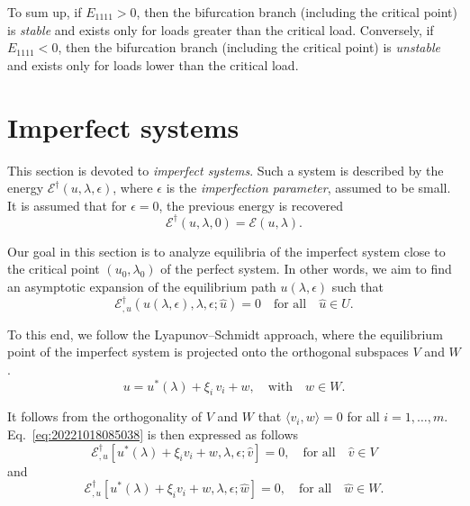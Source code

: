 \documentclass[12pt, final]{scrartcl}
\theoremstyle{definition}
\newcommand{\E}{\mathcal E}
\newcommand{\EE}{\mathcal E ^ \dagger}
\begin{document}
To sum up, if $E_{1111} > 0$, then the bifurcation branch (including the critical point) is \emph{stable} and exists
only for loads greater than the critical load. Conversely, if $E_{1111} < 0$, then the bifurcation branch (including the
critical point) is \emph{unstable} and exists only for loads lower than the critical load.

\section{Imperfect systems}
\label{sec:20221018083712}

This section is devoted to \emph{imperfect systems}. Such a system is described by the energy
\(\EE(u, \lambda, \epsilon)\), where \(\epsilon\) is the \emph{imperfection parameter}, assumed to be small. It is
assumed that for \(\epsilon = 0\), the previous energy is recovered
\begin{equation}
  \EE(u, \lambda, 0) = \E(u, \lambda).
\end{equation}

Our goal in this section is to analyze equilibria of the imperfect system close to the critical point
\((u_0, \lambda_0)\) of the perfect system. In other words, we aim to find an asymptotic expansion of the equilibrium
path \(u(\lambda, \epsilon)\) such that
\begin{equation}
  \label{eq:20221018085038}
  \EE_{,u}(u(\lambda, \epsilon), \lambda, \epsilon; \hat{u}) = 0 \quad \text{for all} \quad \hat{u} \in U.
\end{equation}

To this end, we follow the Lyapunov--Schmidt approach, where the equilibrium point of the imperfect system is projected
onto the orthogonal subspaces \(V\) and \(W\).
\begin{equation}
  \label{eq:20220902174235}
  u = u^\ast(\lambda) + \xi_i \, v_i + w, \quad \text{with} \quad w \in W.
\end{equation}

It follows from the orthogonality of $V$ and $W$ that $\langle v_i, w \rangle = 0$ for all $i=1, \ldots,
m$. Eq.~\eqref{eq:20221018085038} is then expressed as follows
\begin{equation}
  \label{eq:20220901120544}
  \EE_{,u}[u^\ast(\lambda) + \xi_i v_i + w, \lambda, \epsilon; \hat{v}] = 0, \quad \text{for all} \quad \hat{v} \in V
\end{equation}
and
\begin{equation}
  \label{eq:20220825143616}
  \EE_{,u}[u^\ast(\lambda) + \xi_i v_i + w, \lambda, \epsilon; \hat{w}] = 0, \quad \text{for all} \quad \hat{w} \in W.
\end{equation}
\end{document}
